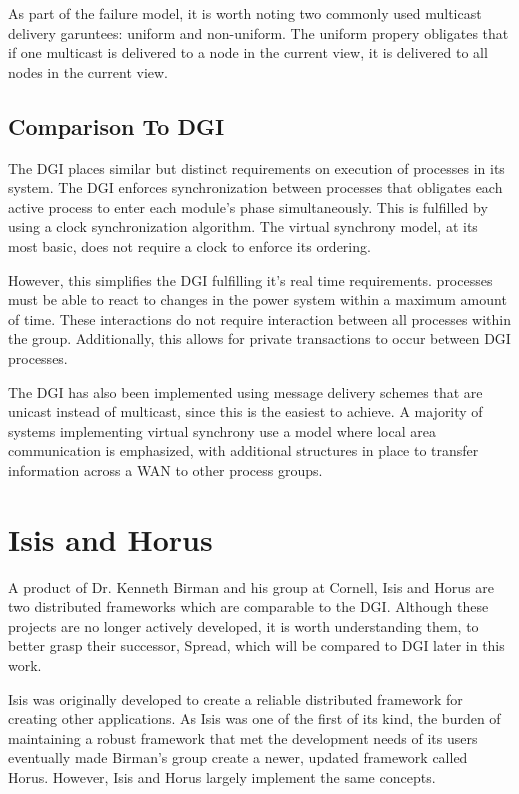 As part of the failure model, it is worth noting two commonly used multicast
delivery garuntees: uniform and non-uniform. The uniform propery obligates that
if one multicast is delivered to a node in the current view, it is delivered to
all nodes in the current view.

\subsection{Comparison To DGI}

The DGI places similar but distinct requirements on execution of processes in
its system. The DGI enforces synchronization between processes that obligates
each active process to enter each module's phase simultaneously. This is
fulfilled by using a clock synchronization algorithm. The virtual synchrony
model, at its most basic, does not require a clock to enforce its ordering.

However, this simplifies the DGI fulfilling it's real time requirements. 
processes must be able to react to changes in the power system within a
maximum amount of time. These interactions do not require interaction between
all processes within the group. Additionally, this allows for private
transactions to occur between DGI processes.

The DGI has also been implemented using message delivery schemes that are
unicast instead of multicast, since this is the easiest to achieve. A
majority of systems implementing virtual synchrony use a model where local
area communication is emphasized, with additional structures in place to
transfer information across a WAN to other process groups.

\section{Isis and Horus}

A product of Dr. Kenneth Birman and his group at Cornell, Isis and Horus are
two distributed frameworks which are comparable to the DGI. Although these
projects are no longer actively developed, it is worth understanding them,
to better grasp their successor, Spread, which will be compared to DGI later
in this work.

Isis was originally developed to create a reliable distributed framework for
creating other applications. As Isis was one of the first of its kind, the
burden of maintaining a robust framework that met the development needs of its
users eventually made Birman's group create a newer, updated framework called
Horus. However, Isis and Horus largely implement the same concepts.


